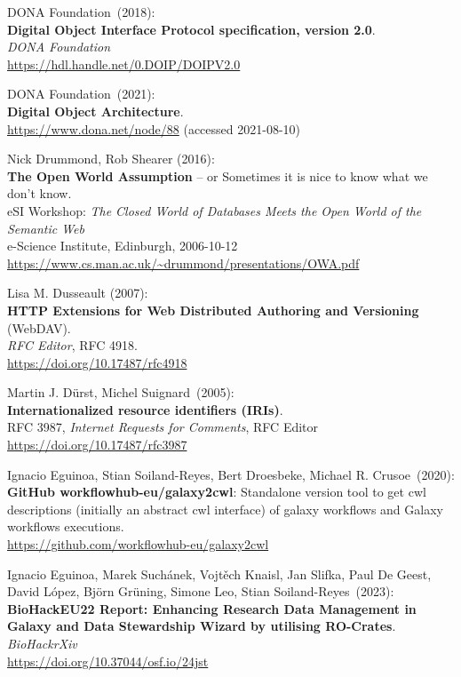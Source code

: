 \begin{thebibliography}{9}
DONA Foundation~(2018):\\
\textbf{Digital Object Interface Protocol specification, version 2.0}.\\
\emph{DONA Foundation}\\
\url{https://hdl.handle.net/0.DOIP/DOIPV2.0}

DONA Foundation~(2021):\\
\textbf{Digital Object Architecture}.\\
\url{https://www.dona.net/node/88} (accessed 2021-08-10)

Nick Drummond, Rob Shearer (2016):\\
\textbf{The Open World Assumption} -- or Sometimes it is nice to know what we don't know.\\
eSI Workshop: \emph{The Closed World of Databases Meets the Open World of the Semantic Web}\\
e-Science Institute, Edinburgh, 2006-10-12\\
\url{https://www.cs.man.ac.uk/~drummond/presentations/OWA.pdf}

Lisa M. Dusseault (2007): \\
\textbf{HTTP Extensions for Web Distributed Authoring and Versioning} (WebDAV). \\
\emph{RFC Editor}, RFC 4918.\\
\url{https://doi.org/10.17487/rfc4918}

Martin J. Dürst, Michel Suignard~(2005):\\
\textbf{Internationalized resource identifiers (IRIs)}.\\
RFC 3987, \emph{Internet Requests for Comments}, RFC Editor\\
\url{https://doi.org/10.17487/rfc3987}

Ignacio Eguinoa, Stian Soiland-Reyes, Bert Droesbeke, Michael
R. Crusoe~(2020):\\
\textbf{GitHub workflowhub-eu/galaxy2cwl}: Standalone version tool to
get cwl descriptions (initially an abstract cwl interface) of galaxy
workflows and Galaxy workflows executions.\\
\url{https://github.com/workflowhub-eu/galaxy2cwl}

Ignacio Eguinoa, Marek Suchánek, Vojtěch Knaisl, Jan Slifka, Paul De Geest, David López, Björn Grüning, Simone Leo, Stian Soiland-Reyes~(2023):\\
\textbf{BioHackEU22 Report: Enhancing Research Data Management in Galaxy and Data Stewardship Wizard by utilising RO-Crates}.\\
\emph{BioHackrXiv}\\
\url{https://doi.org/10.37044/osf.io/24jst}


\end{thebibliography}
